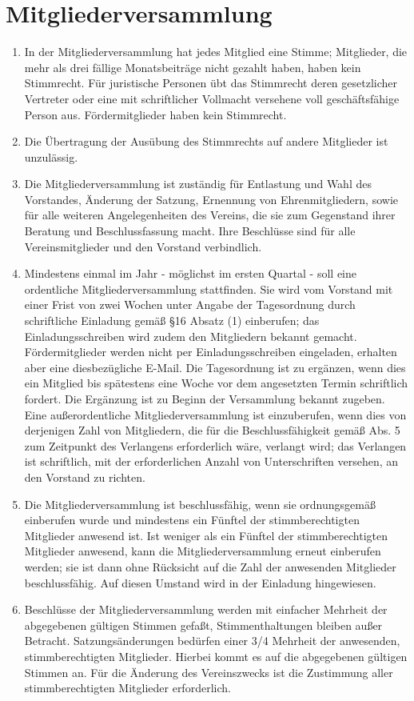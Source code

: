 \documentclass[ngerman]{scrartcl}
\begin{document}
\section{Mitgliederversammlung} \label{sec:mitgliederversammlung}
\begin{enumerate}
 \item In der Mitgliederversammlung hat jedes Mitglied eine Stimme; 
 Mitglieder, die mehr als drei fällige Monatsbeiträge nicht gezahlt 
 haben, haben kein Stimmrecht. Für juristische Personen übt das 
 Stimmrecht deren gesetzlicher Vertreter  oder eine mit schriftlicher 
 Vollmacht versehene voll geschäftsfähige Person aus. Fördermitglieder
 haben kein Stimmrecht.
 \item Die Übertragung der Ausübung des Stimmrechts auf andere
 Mitglieder ist unzulässig.
 \item Die Mitgliederversammlung ist zuständig für Entlastung
 und Wahl des Vorstandes, Änderung der Satzung, Ernennung von
 Ehrenmitgliedern, sowie für alle weiteren Angelegenheiten des
 Vereins, die sie zum Gegenstand ihrer Beratung und
 Beschlussfassung macht. Ihre Beschlüsse sind für alle
 Vereinsmitglieder und den Vorstand verbindlich.
 \item Mindestens einmal im Jahr - möglichst im ersten Quartal -
 soll eine ordentliche Mitgliederversammlung stattfinden. Sie
 wird vom Vorstand mit einer Frist von zwei Wochen unter
 Angabe der Tagesordnung durch schriftliche Einladung gemäß
 §16 Absatz (1) einberufen; das Einladungsschreiben wird zudem
 den Mitgliedern bekannt gemacht. Fördermitglieder werden nicht
 per Einladungsschreiben eingeladen, erhalten aber eine diesbezügliche
 E-Mail. Die Tagesordnung ist zu ergänzen,
 wenn dies ein Mitglied bis spätestens eine Woche vor dem
 angesetzten Termin schriftlich fordert. Die Ergänzung ist zu
 Beginn der Versammlung bekannt zugeben. Eine außerordentliche
 Mitgliederversammlung ist einzuberufen, wenn dies von
 derjenigen Zahl von Mitgliedern, die für die
 Beschlussfähigkeit gemäß Abs. 5 zum Zeitpunkt des Verlangens
 erforderlich wäre, verlangt wird; das Verlangen ist
 schriftlich, mit der erforderlichen Anzahl von Unterschriften
 versehen, an den Vorstand zu richten.
 \item Die Mitgliederversammlung ist beschlussfähig, wenn sie
 ordnungsgemäß einberufen wurde und mindestens ein Fünftel der
 stimmberechtigten Mitglieder anwesend ist. Ist weniger als
 ein Fünftel der stimmberechtigten Mitglieder anwesend, kann
 die  Mitgliederversammlung erneut einberufen werden; sie ist
 dann ohne Rücksicht auf die Zahl der anwesenden Mitglieder
 beschlussfähig. Auf diesen Umstand wird in der Einladung
 hingewiesen.
 \item Beschlüsse der Mitgliederversammlung werden mit einfacher
 Mehrheit der abgegebenen gültigen Stimmen gefaßt,
 Stimmenthaltungen bleiben außer Betracht. Satzungsänderungen
 bedürfen einer 3/4 Mehrheit der anwesenden, stimmberechtigten
 Mitglieder. Hierbei kommt es auf die abgegebenen gültigen
 Stimmen an. Für die Änderung des Vereinszwecks ist die
 Zustimmung aller stimmberechtigten Mitglieder erforderlich.
\end{enumerate}
\end{document}
